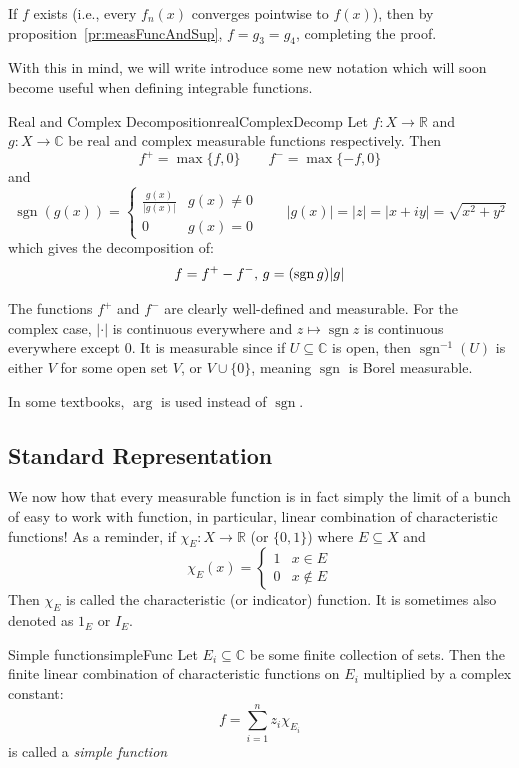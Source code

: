 \documentclass[oneside]{book}
\newcommand{\R}{\mathbb{R}}
\renewcommand{\C}{\mathbb{C}}
\newcommand{\sse}{\subseteq}
\newcommand{\sgn}{\operatorname{sgn}}
\newcommand{\rw}{\rightarrow}
\begin{document}
\begin{Proof}
	If $f$ exists (i.e., every $f_n(x)$ converges pointwise to $f(x)$), then by
	proposition~\ref{pr:measFuncAndSup}, $f = g_3 = g_4$, completing the proof.
\end{Proof}

With this in mind, we will write introduce some new notation which will soon become useful when defining integrable
functions. 

\begin{defn}{Real and Complex Decomposition}{realComplexDecomp}
	Let $f:X \rw \R$ and $g: X \rw \C$ be real and complex measurable functions respectively. Then
	\[
		f^+ = \max\{f, 0\} \qquad f^- = \max\{-f, 0\}
	\]
	and
	\[
		\sgn(g(x)) = \begin{cases}
			\frac{g(x)}{|g(x)|} & g(x) \ne 0\\
			0 & g(x) = 0
		\end{cases}
		\qquad
		|g(x)| = |z| = |x+iy| = \sqrt{x^2 + y^2}
	\]
	which gives the decomposition of:
	\[
		f = f^+ - f^-$, $g = (\sgn g)|g|
	\]
\end{defn}

The functions $f^+$ and $f^-$ are clearly well-defined and measurable. For the complex case, $|\cdot|$ is continuous everywhere and $z \mapsto \sgn z$
is continuous everywhere except $0$. It is measurable since if $U \sse \C$ is open, then $\sgn^{-1}(U)$ is either $V$
for some open set $V$, or $V\cup \{0\}$, meaning $\sgn$ is Borel measurable.

In some textbooks, $\operatorname{arg}$ is used instead of $\sgn$. 

\subsection{Standard Representation}

We now how that every measurable function is in fact simply the limit of a bunch of easy to work with function, in
particular, linear combination of characteristic functions! As a reminder, if $\chi_E: X \rw \R$ (or $\{0,1\}$) where $E \sse X$ and
\[
	\chi_E(x) = \begin{cases}
		1 & x \in E\\
		0 & x \notin E
	\end{cases}
\]
Then $\chi_E$ is called the characteristic (or indicator) function. It is sometimes also denoted as $1_E$ or $I_E$. 

\begin{defn}{Simple function}{simpleFunc}
	Let $E_i \sse \C$ be some finite collection of sets. Then the finite linear combination of characteristic functions
	on $E_i$ multiplied by a complex constant:
	\[
		f = \sum_{i=1}^n z_i\chi_{E_i}
	\]
	is called a \emph{simple function}
\end{defn}
\end{document}
